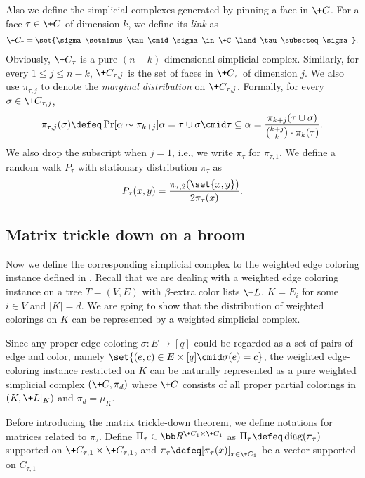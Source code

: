 \documentclass[a4paper,11pt]{article}
\begin{document}
Also we define the simplicial complexes generated by pinning a face in $\+C$. For a face $\tau \in \+C$ of dimension $k$, we define its \emph{link} as
\begin{align*}
    \+C_\tau=\set{\sigma\setminus \tau \cmid \sigma \in \+C \land \tau \subseteq \sigma }.
\end{align*}
Obviously, $\+C_\tau$ is a pure $(n-k)$-dimensional simplicial complex. Similarly, for every $1\le j \le n-k$, $\+C_{\tau,j}$ is the set of faces in $\+C_\tau$ of dimension $j$. We also use $\pi_{\tau,j}$ to denote the \emph{marginal distribution} on $\+C_{\tau,j}$. Formally, for every $\sigma\in \+C_{\tau,j}$,
\begin{align*}
    \pi_{\tau,j}(\sigma)\defeq \Pr[\alpha \sim \pi_{k+j}]{\alpha=\tau \cup \sigma \cmid \tau\subseteq \alpha}=\frac{\pi_{k+j}(\tau \cup \sigma)}{\binom{k+j}{k} \cdot \pi_{k}(\tau)}.
\end{align*}
We also drop the subscript when $j=1$, i.e., we write $\pi_\tau$ for $\pi_{\tau,1}$. We define a random walk $P_\tau$ with stationary distribution $\pi_\tau$ as
\[
P_\tau(x,y)=\frac{\pi_{\tau,2}(\set{x,y})}{2\pi_\tau(x)}.
\]




\subsection{Matrix trickle down on a broom}

Now we define the corresponding simplicial complex to the weighted edge coloring instance defined in .
Recall that we are dealing with a weighted edge coloring instance on a tree $T=(V, E)$
with $\beta$-extra color lists $\+L$. $K = E_i$ for some $i\in V$ and $|K| = d$.
We are going to show that the distribution of weighted colorings on $K$ can be
represented by a weighted simplicial complex.

Since any proper edge coloring  $\sigma:E\rightarrow [q]$ could be regarded as a set of pairs of edge and color, namely $\set{(e,c)\in E\times [q]\cmid \sigma(e)=c}$, the weighted edge-coloring instance restricted on $K$ can be naturally represented as a pure weighted simplicial complex $(\+C,\pi_{d})$ where $\+C$ consists of all proper partial colorings in $(K,\+L|_K)$ and $\pi_{d}=\mu_K$.

Before introducing the matrix trickle-down theorem, we define notations for matrices related to $\pi_\tau$. Define $\Pi_\tau \in \bb R^{\+C_1\times\+C_1}$ as $\Pi_\tau \defeq \operatorname{diag}(\pi_\tau)$ supported on $\+C_{\tau,1}\times \+C_{\tau,1}$,
and $\pi_\tau\defeq[\pi_\tau(x)]_{x\in \+C_1}$ be a vector supported on $C_{\tau, 1}$
\end{document}
